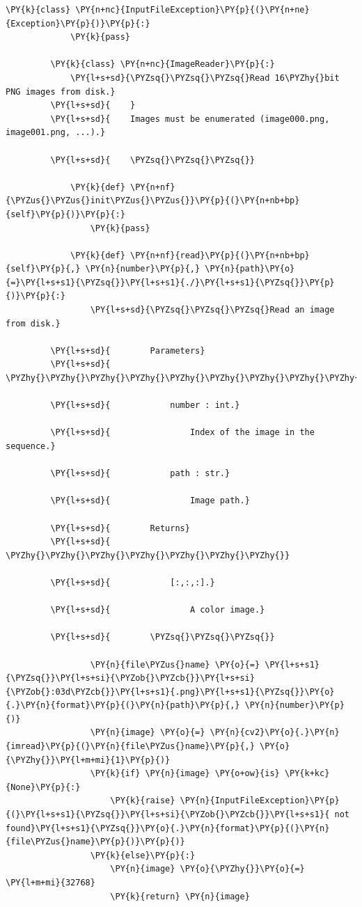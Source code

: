 {\begin{Verbatim}[commandchars=\\\{\}]
         \PY{k}{class} \PY{n+nc}{InputFileException}\PY{p}{(}\PY{n+ne}{Exception}\PY{p}{)}\PY{p}{:}
             \PY{k}{pass}
         
         \PY{k}{class} \PY{n+nc}{ImageReader}\PY{p}{:}
             \PY{l+s+sd}{\PYZsq{}\PYZsq{}\PYZsq{}Read 16\PYZhy{}bit PNG images from disk.}
         \PY{l+s+sd}{    }
         \PY{l+s+sd}{    Images must be enumerated (image000.png, image001.png, ...).}
         
         \PY{l+s+sd}{    \PYZsq{}\PYZsq{}\PYZsq{}}
         
             \PY{k}{def} \PY{n+nf}{\PYZus{}\PYZus{}init\PYZus{}\PYZus{}}\PY{p}{(}\PY{n+nb+bp}{self}\PY{p}{)}\PY{p}{:}
                 \PY{k}{pass}
         
             \PY{k}{def} \PY{n+nf}{read}\PY{p}{(}\PY{n+nb+bp}{self}\PY{p}{,} \PY{n}{number}\PY{p}{,} \PY{n}{path}\PY{o}{=}\PY{l+s+s1}{\PYZsq{}}\PY{l+s+s1}{./}\PY{l+s+s1}{\PYZsq{}}\PY{p}{)}\PY{p}{:}
                 \PY{l+s+sd}{\PYZsq{}\PYZsq{}\PYZsq{}Read an image from disk.}
         
         \PY{l+s+sd}{        Parameters}
         \PY{l+s+sd}{        \PYZhy{}\PYZhy{}\PYZhy{}\PYZhy{}\PYZhy{}\PYZhy{}\PYZhy{}\PYZhy{}\PYZhy{}\PYZhy{}}
         
         \PY{l+s+sd}{            number : int.}
         
         \PY{l+s+sd}{                Index of the image in the sequence.}
         
         \PY{l+s+sd}{            path : str.}
         
         \PY{l+s+sd}{                Image path.}
         
         \PY{l+s+sd}{        Returns}
         \PY{l+s+sd}{        \PYZhy{}\PYZhy{}\PYZhy{}\PYZhy{}\PYZhy{}\PYZhy{}\PYZhy{}}
         
         \PY{l+s+sd}{            [:,:,:].}
         
         \PY{l+s+sd}{                A color image.}
         
         \PY{l+s+sd}{        \PYZsq{}\PYZsq{}\PYZsq{}}
         
                 \PY{n}{file\PYZus{}name} \PY{o}{=} \PY{l+s+s1}{\PYZsq{}}\PY{l+s+si}{\PYZob{}\PYZcb{}}\PY{l+s+si}{\PYZob{}:03d\PYZcb{}}\PY{l+s+s1}{.png}\PY{l+s+s1}{\PYZsq{}}\PY{o}{.}\PY{n}{format}\PY{p}{(}\PY{n}{path}\PY{p}{,} \PY{n}{number}\PY{p}{)}
                 \PY{n}{image} \PY{o}{=} \PY{n}{cv2}\PY{o}{.}\PY{n}{imread}\PY{p}{(}\PY{n}{file\PYZus{}name}\PY{p}{,} \PY{o}{\PYZhy{}}\PY{l+m+mi}{1}\PY{p}{)}
                 \PY{k}{if} \PY{n}{image} \PY{o+ow}{is} \PY{k+kc}{None}\PY{p}{:}
                     \PY{k}{raise} \PY{n}{InputFileException}\PY{p}{(}\PY{l+s+s1}{\PYZsq{}}\PY{l+s+si}{\PYZob{}\PYZcb{}}\PY{l+s+s1}{ not found}\PY{l+s+s1}{\PYZsq{}}\PY{o}{.}\PY{n}{format}\PY{p}{(}\PY{n}{file\PYZus{}name}\PY{p}{)}\PY{p}{)}
                 \PY{k}{else}\PY{p}{:}
                     \PY{n}{image} \PY{o}{\PYZhy{}}\PY{o}{=} \PY{l+m+mi}{32768}
                     \PY{k}{return} \PY{n}{image}
         

\end{Verbatim}}
